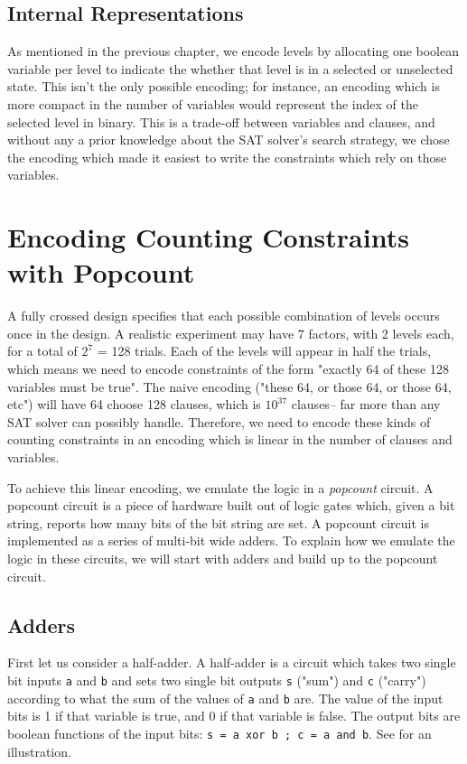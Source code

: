 \subsection{Internal Representations}

As mentioned in the previous chapter, we encode levels by allocating one boolean variable per level to indicate the whether that level is in a selected or unselected state. This isn't the only possible encoding; for instance, an encoding which is more compact in the number of variables would represent the index of the selected level in binary. This is a trade-off between variables and clauses, and without any a prior knowledge about the SAT solver's search strategy, we chose the encoding which made it easiest to write the constraints which rely on those variables.


\section{Encoding Counting Constraints with Popcount}

A fully crossed design specifies that each possible combination of levels occurs once in the design. A realistic experiment may have 7 factors, with 2 levels each, for a total of $2^7$ = 128 trials. Each of the levels will appear in half the trials, which means we need to encode constraints of the form "exactly 64 of these 128 variables must be true". The naive encoding ("these 64, or those 64, or those 64, etc") will have 64 choose 128 clauses, which is $10^{37}$ clauses-- far more than any SAT solver can possibly handle. Therefore, we need to encode these kinds of counting constraints in an encoding which is linear in the number of clauses and variables.

To achieve this linear encoding, we emulate the logic in a \emph{popcount} circuit. A popcount circuit is a piece of hardware built out of logic gates which, given a bit string, reports how many bits of the bit string are set. A popcount circuit is implemented as a series of multi-bit wide adders. To explain how we emulate the logic in these circuits, we will start with adders and build up to the popcount circuit.

\subsection{Adders}

First let us consider a half-adder. A half-adder is a circuit which takes two single bit inputs \texttt{a} and \texttt{b} and sets two single bit outputs \texttt{s} ("sum") and \texttt{c} ("carry") according to what the sum of the values of \texttt{a} and \texttt{b} are. The value of the input bits is 1 if that variable is true, and 0 if that variable is false. The output bits are boolean functions of the input bits: \texttt{s = a xor b ; c = a and b}. See  for an illustration.

